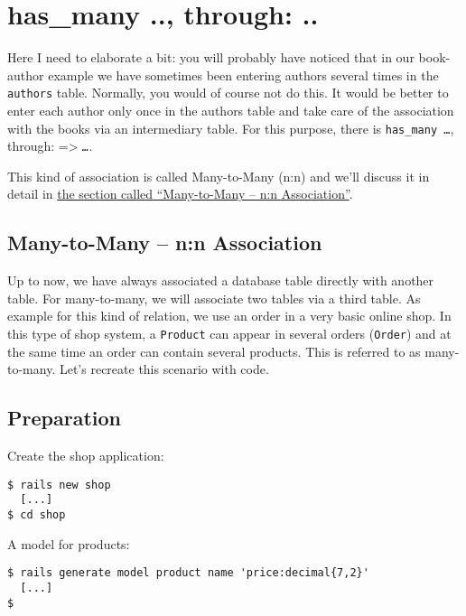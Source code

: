 \documentclass[a4paper]{book}
\newcounter{tab}[chapter]
\newcommand{\chap}[1]{\newpage\thispagestyle{empty}\chapter{#1}\label{chap:\thechapter}}
\begin{document}
\chap{has\_many .., through: ..}\label{hasux5fmany-..-through-..}

Here I need to elaborate a bit: you will probably have noticed that in our book-author example we have sometimes been entering authors several times in the \texttt{authors} table. Normally, you would of course not do this. It would be better to enter each author only once in the authors table and take care of the association with the books via an intermediary table. For this purpose, there is \texttt{has\_many \ldots{}}, through: =\textgreater{} \emph{\texttt{\ldots{}}}.

This kind of association is called Many-to-Many (n:n) and we'll discuss it in detail in \hyperref[ar-manyux5ftoux5fmany]{the section called “Many-to-Many -- n:n Association”}.

\section{Many-to-Many -- n:n Association}\label{many-to-many-nn-association}

Up to now, we have always associated a database table directly with another table. For many-to-many, we will associate two tables via a third table. As example for this kind of relation, we use an order in a very basic online shop. In this type of shop system, a \texttt{Product} can appear in several orders (\texttt{Order}) and at the same time an order can contain several products. This is referred to as many-to-many. Let's recreate this scenario with code.

\section{Preparation}\label{preparation}

Create the shop application:

\begin{shaded}\begin{verbatim}
$ rails new shop
  [...]
$ cd shop
\end{verbatim}\end{shaded}

A model for products:

\begin{shaded}\begin{verbatim}
$ rails generate model product name 'price:decimal{7,2}'
  [...]
$
\end{verbatim}\end{shaded}
\end{document}
